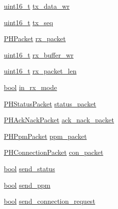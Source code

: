 \begin{DoxyCompactItemize}
\item 
\hyperlink{stdint_8h_a273cf69d639a59973b6019625df33e30}{uint16\-\_\-t} \hyperlink{structpios__rfm22b__dev_a6fa47c8dff475d9292a547732cbe4138}{tx\-\_\-data\-\_\-wr}
\item 
\hyperlink{stdint_8h_a273cf69d639a59973b6019625df33e30}{uint16\-\_\-t} \hyperlink{structpios__rfm22b__dev_ac7ab84030bbfedd9cf397152e1d17ff9}{tx\-\_\-seq}
\item 
\hyperlink{struct_p_h_packet}{P\-H\-Packet} \hyperlink{structpios__rfm22b__dev_a6c8fb7a4ca0874d372ec084d2089f43c}{rx\-\_\-packet}
\item 
\hyperlink{stdint_8h_a273cf69d639a59973b6019625df33e30}{uint16\-\_\-t} \hyperlink{structpios__rfm22b__dev_aa31cc789855ee5b29487085603190aa3}{rx\-\_\-buffer\-\_\-wr}
\item 
\hyperlink{stdint_8h_a273cf69d639a59973b6019625df33e30}{uint16\-\_\-t} \hyperlink{structpios__rfm22b__dev_acf4806b2fb1db624e1fa47dad08ba447}{rx\-\_\-packet\-\_\-len}
\item 
\hyperlink{group___exported__types_gaf6a258d8f3ee5206d682d799316314b1}{bool} \hyperlink{structpios__rfm22b__dev_a5d1bb77d70e2da36174e66d08e42cac6}{in\-\_\-rx\-\_\-mode}
\item 
\hyperlink{struct_p_h_status_packet}{P\-H\-Status\-Packet} \hyperlink{structpios__rfm22b__dev_a655ec6ecb5828af1262a9108c8fb25f7}{status\-\_\-packet}
\item 
\hyperlink{struct_p_h_ack_nack_packet}{P\-H\-Ack\-Nack\-Packet} \hyperlink{structpios__rfm22b__dev_a57f8d0ab5171f50e634940b11cc402c1}{ack\-\_\-nack\-\_\-packet}
\item 
\hyperlink{struct_p_h_ppm_packet}{P\-H\-Ppm\-Packet} \hyperlink{structpios__rfm22b__dev_abdfbc812f36087f9b8392e9303f28086}{ppm\-\_\-packet}
\item 
\hyperlink{struct_p_h_connection_packet}{P\-H\-Connection\-Packet} \hyperlink{structpios__rfm22b__dev_a8bfeaddca61583fad2b2396d61d4c459}{con\-\_\-packet}
\item 
\hyperlink{group___exported__types_gaf6a258d8f3ee5206d682d799316314b1}{bool} \hyperlink{structpios__rfm22b__dev_abf332b1a47bf1d07fbc580382acd4b95}{send\-\_\-status}
\item 
\hyperlink{group___exported__types_gaf6a258d8f3ee5206d682d799316314b1}{bool} \hyperlink{structpios__rfm22b__dev_a44f9d9da0b1740ea9f077873f766ee45}{send\-\_\-ppm}
\item 
\hyperlink{group___exported__types_gaf6a258d8f3ee5206d682d799316314b1}{bool} \hyperlink{structpios__rfm22b__dev_afd7377cf7b2ada828b83887653e4d3c2}{send\-\_\-connection\-\_\-request}

\end{DoxyCompactItemize}

